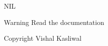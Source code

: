 
\begin{DoxyRefList}
\item[\label{bug__bug000001}%
\hypertarget{bug__bug000001}{}%
Class \hyperlink{class_universe}{Universe} ]N\-I\-L \begin{DoxyWarning}{Warning}
Read the documentation 
\end{DoxyWarning}
\begin{DoxyCopyright}{Copyright}
Vishal Kasliwal 
\end{DoxyCopyright}

\end{DoxyRefList}